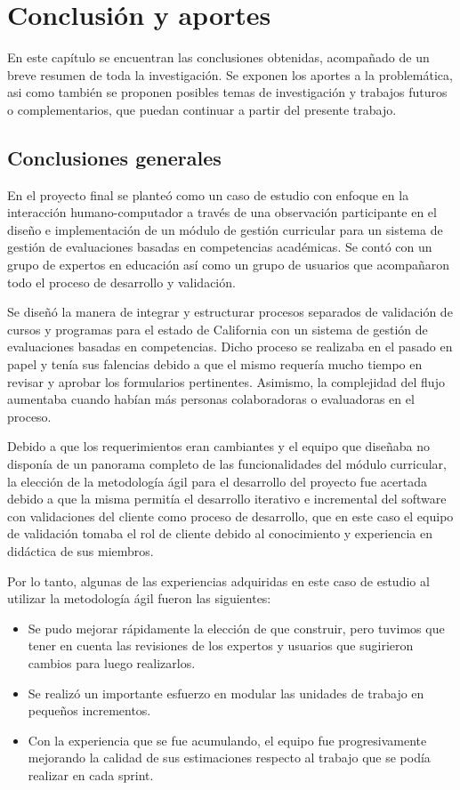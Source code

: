 
\chapter{Conclusión y aportes} \label{capitulo7} 
En este capítulo se encuentran las conclusiones obtenidas, acompañado de un breve resumen de toda la investigación. Se exponen los aportes a la problemática, asi como también se proponen posibles temas de investigación y trabajos futuros o complementarios, que puedan continuar a partir del presente trabajo.

\section{Conclusiones generales}
En el proyecto final se planteó como un caso de estudio con enfoque en la interacción humano-computador a través de una observación participante en el diseño e implementación de un módulo de gestión curricular para un sistema de gestión de evaluaciones basadas en competencias académicas. Se contó con un grupo de expertos en educación así como un grupo de usuarios que acompañaron todo el proceso de desarrollo y validación.

Se diseñó la manera de integrar y estructurar procesos separados de validación de cursos y programas para el estado de California con un sistema de gestión de evaluaciones basadas en competencias. Dicho proceso se realizaba en el pasado en papel y tenía sus falencias debido a que el mismo requería mucho tiempo en revisar y aprobar los formularios pertinentes. Asimismo, la complejidad del flujo aumentaba cuando habían más personas colaboradoras o evaluadoras en el proceso.

Debido a que los requerimientos eran cambiantes y el equipo que diseñaba no disponía de un panorama completo de las funcionalidades del módulo curricular, la elección de la metodología ágil para el desarrollo del proyecto fue acertada debido a que la misma permitía el desarrollo iterativo e incremental del software con validaciones del cliente como proceso de desarrollo, que en este caso el equipo de validación tomaba el rol de cliente debido al conocimiento y experiencia en didáctica de sus miembros.

Por lo tanto, algunas de las experiencias adquiridas en este caso de estudio al utilizar la metodología ágil fueron las siguientes:
\begin{itemize}
	\item Se pudo mejorar rápidamente la elección de que construir, pero tuvimos que tener en cuenta las revisiones de los expertos y usuarios que sugirieron cambios para luego realizarlos.
	\item Se realizó un importante esfuerzo en modular las unidades de trabajo en pequeños incrementos.
	\item Con la experiencia que se fue acumulando, el equipo fue progresivamente mejorando la calidad de sus estimaciones respecto al trabajo que se podía realizar en cada sprint.
\end{itemize}

